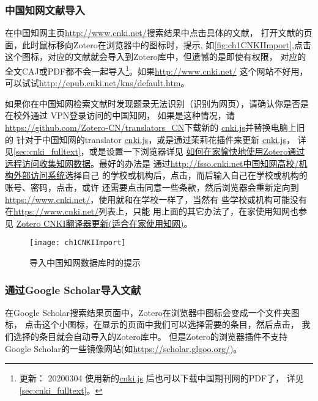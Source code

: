 \documentclass[cn,11pt,chinese]{elegantbook}
\begin{document}
	\subsubsection{中国知网文献导入} \label{sec:cnki}
	在中国知网主页\url{http://www.cnki.net/}搜索结果中点击具体的文献，
	打开文献的页面，此时鼠标移向Zotero在浏览器中的图标时，提示,
	如\autoref{fig:ch1CNKIImport},点击这个图标，对应的文献就会导入到Zotero库中，但遗憾的是即使有权限，
	对应的全文CAJ或PDF都不会一起导入\footnote{更新：
	20200304 使用新的\href{https://github.com/Zotero-CN/translators_CN}{cnki.js}
	后也可以下载中国期刊网的PDF了，
	详见\cref{sec:cnki_fulltext}。}。如果\url{http://www.cnki.net/}
	这个网站不好用，可以试试\url{http://epub.cnki.net/kns/default.htm}。

	如果你在中国知网检索文献时发现题录无法识别（识别为网页），请确认你是否是在校外通过
	VPN登录访问的中国知网， 如果是这种情况，请
	\href{https://github.com/Zotero-CN/translators_CN}
	{https://github.com/Zotero-CN/translators_CN}下载新的
	\href{https://github.com/Zotero-CN/translators_CN}{cnki.js}并替换电脑上旧的
	针对于中国知网的translator \href{https://github.com/Zotero-CN/translators_CN}
	{cnki.js}，或是通过茉莉花插件来更新
	\href{https://github.com/Zotero-CN/translators_CN}{cnki.js}，
	详见\cref{sec:cnki_fulltext}，或是设置一下浏览器详见
	\href{https://zhuanlan.zhihu.com/p/110731827}
	{如何在家愉快地使用Zotero通过远程访问收集知网数据}。最好的办法是
	通过\href{ http://fsso.cnki.net}{http://fsso.cnki.net中国知网高校/机构外部访问系统}选择自己
	的学校或机构后，点击，而后输入自己在学校或机构的账号、密码，点击，或许
	还需要点击同意一些条款，然后浏览器会重新定向到
	\href{www.cnki.net}{https://www.cnki.net/}，使用就和在学校一样了，当然有
	些学校或机构可能没有在\href{www.cnki.net}{https://www.cnki.net/}列表上，只能
	用上面的其它办法了，在家使用知网也参见
	\href{https://zhuanlan.zhihu.com/p/351547307}{Zotero CNKI翻译器更新(适合在家使用知网)}。
	\begin{figure}[htbp]
		\centering
		\texttt{[image: ch1CNKIImport]}
		\caption{导入中国知网数据库时的提示}
		\label{fig:ch1CNKIImport}
	\end{figure}
	\subsubsection{通过Google Scholar导入文献}
	在Google Scholar搜索结果页面中，Zotero在浏览器中图标会变成一个文件夹图标，
	点击这个小图标，在显示的页面中我们可以选择需要的条目，然后点击，
	我们选择的条目就会自动导入的Zotero库中。
	但是Zotero的浏览器插件不支持Google Scholar的一些镜像网站(如\url{https://scholar.glgoo.org/})。
\end{document}
